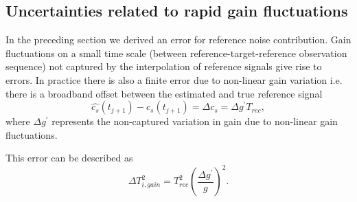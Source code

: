 \subsection{Uncertainties related to rapid gain fluctuations}
\label{sec:gainvar}
In the preceding section we derived an error for reference noise contribution.
%
Gain fluctuations on a small time scale (between reference-target-reference
observation sequence) not captured by the interpolation of reference signals
give rise to errors.
In practice there is also a finite error due to non-linear gain variation 
i.e. there is a broadband offset between the estimated and true reference signal
\begin{equation}
\hat{c_{s}}(t_{j+1}) - c_{s}(t_{j+1}) = \Delta c_{s} = \Delta g^{'} T_{rec},
\end{equation}
where \(\Delta g^{'}\) represents the non-captured variation in gain
due to non-linear gain fluctuations.

This error can be described as
\begin{equation}
\Delta T_{i,gain}^2 = T_{rec}^{2}\left(\frac{\Delta g^{'}}{g}\right)^{2}.
\label{eq:gainvar}
\end{equation}

